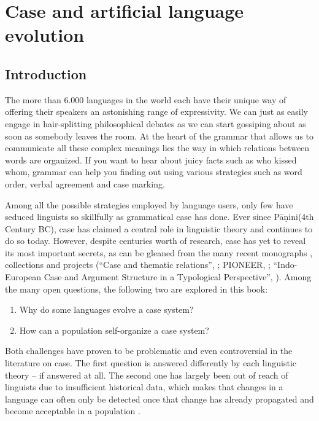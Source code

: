 
\chapter{Case and artificial language evolution}
\section{Introduction}
The more than 6.000 languages in the world each have their unique way of offering their speakers an astonishing range of expressivity. We can just as easily engage in hair-splitting philosophical debates as we can start gossiping about as soon as somebody leaves the room. At the heart of the grammar that allows us to communicate all these complex meanings lies the way in which relations between words are organized. If you want to hear about juicy facts such as who kissed whom, grammar can help you finding out using various strategies such as word order, verbal agreement and case marking.

Among all the possible strategies employed by language users, only few have seduced linguists so skillfully as grammatical case has done. Ever since P\={a}\d{n}ini(4th Century BC), case has claimed a central role in linguistic theory and continues to do so today. However, despite centuries worth of research, case has yet to reveal its most important secrets, as can be gleaned from the many recent monographs \citep{blake94case,butt06theories}, collections \citep{kulikov06casebook,barddal09casebook,malchukov09case} and projects (``Case and thematic relations'', \citealp{davidse96functional}; PIONEER, \citealp{amberber05competition}; ``Indo-European Case and Argument Structure in a Typological Perspective'', \citealp{barddal09case}). 
Among the many open questions, the following two are explored in this book:

\begin{enumerate}
\item Why do some languages evolve a case system?
\item How can a population self-organize a case system?
\end{enumerate}

Both challenges have proven to be problematic and even controversial in the literature on case. The first question is answered differently by each linguistic theory -- if answered at all. The second one has largely been out of reach of linguists due to insufficient historical data, which makes that changes in a language can often only be detected once that change has already propagated and become acceptable in a population \citep[34--35]{croft91syntactic}.

